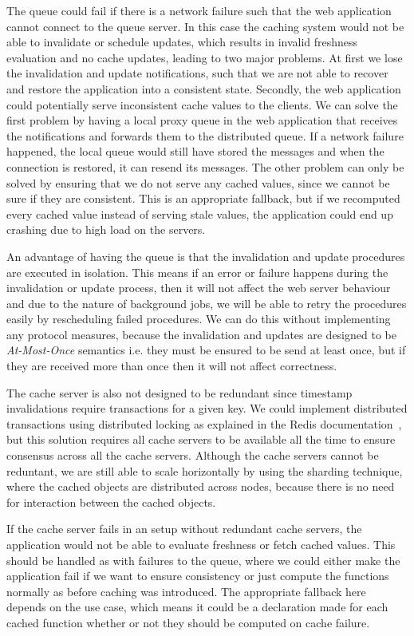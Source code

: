 The queue could fail if there is a network failure such that the web application cannot connect to the queue server. In this case the caching system would not be able to invalidate or schedule updates, which results in invalid freshness evaluation and no cache updates, leading to two major problems. At first we lose the invalidation and update notifications, such that we are not able to recover and restore the application into a consistent state. Secondly, the web application could potentially serve inconsistent cache values to the clients. We can solve the first problem by having a local proxy queue in the web application that receives the notifications and forwards them to the distributed queue. If a network failure happened, the local queue would still have stored the messages and when the connection is restored, it can resend its messages. The other problem can only be solved by ensuring that we do not serve any cached values, since we cannot be sure if they are consistent. This is an appropriate fallback, but if we recomputed every cached value instead of serving stale values, the application could end up crashing due to high load on the servers.

An advantage of having the queue is that the invalidation and update procedures are executed in isolation. This means if an error or failure happens during the invalidation or update process, then it will not affect the web server behaviour and due to the nature of background jobs, we will be able to retry the procedures easily by rescheduling failed procedures. We can do this without implementing any protocol measures, because the invalidation and updates are designed to be \emph{At-Most-Once} semantics i.e. they must be ensured to be send at least once, but if they are received more than once then it will not affect correctness.

The cache server is also not designed to be redundant since timestamp invalidations require transactions for a given key. We could implement distributed transactions using distributed locking as explained in the Redis documentation~\cite{docs:redis-locking}, but this solution requires all cache servers to be available all the time to ensure consensus across all the cache servers. Although the cache servers cannot be reduntant, we are still able to scale horizontally by using the sharding technique, where the cached objects are distributed across nodes, because there is no need for interaction between the cached objects.

If the cache server fails in an setup without redundant cache servers, the application would not be able to evaluate freshness or fetch cached values. This should be handled as with failures to the queue, where we could either make the application fail if we want to ensure consistency or just compute the functions normally as before caching was introduced. The appropriate fallback here depends on the use case, which means it could be a declaration made for each cached function whether or not they should be computed on cache failure.


